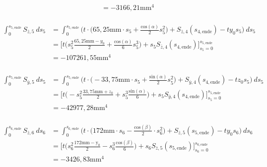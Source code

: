 \begin{itemize}
\begin{equation}
\begin{split}
			 &=-3166,21\mathrm{mm}^4
		\end{split}
	\end{equation}\\
	\begin{equation}
		\begin{split}
			\int_{0}^{s_{5,\mathrm{ende}}} S_{\bar z,5}\ ds_5 &= \int_{0}^{s_{5,\mathrm{ende}}} \bigg(t\cdot\bigg(65,25\mathrm{mm}\cdot s_5 +\frac{\mathrm{cos}(\alpha)}{2}s^2_5\bigg) + S_{\bar z,4}(s_{4,\mathrm{ende}})-ty_0s_5\bigg)\ ds_5\\\
			&= \bigg[t\bigg(s_5^2\frac{65,25\mathrm{mm}-y_0}{2}+\frac{\mathrm{cos}(\alpha)}{6}s^3_5\bigg)+s_5S_{\bar z,4}(s_{4,\mathrm{ende}})\bigg]_{s_5=0}^{s_{5,\mathrm{ende}}}\\\
			&=-107261,55\mathrm{mm}^4
		\end{split}
	\end{equation}\\
	\begin{equation}
		\begin{split}
			\int_{0}^{s_{5,\mathrm{ende}}} S_{\bar y,5}\ ds_5 &= \int_{0}^{s_{5,\mathrm{ende}}} \bigg(t\cdot\bigg(-33,75\mathrm{mm}\cdot s_5 +\frac{\mathrm{sin}(\alpha)}{2}s^2_5\bigg) + S_{\bar y,4}(s_{4,\mathrm{ende}})-tz_0s_5\bigg)\ ds_5\\\
			&=\bigg[t\bigg(-s_5^2\frac{33,75\mathrm{mm}+z_0}{2}+s_5^3\frac{\mathrm{sin}(\alpha)}{6}\bigg)+s_5S_{\bar y,4}(s_{4,\mathrm{ende}})\bigg]_{s_5=0}^{s_{5,\mathrm{ende}}}\\\
			&=-42977,28\mathrm{mm}^4
		\end{split}
	\end{equation}\\
	\begin{equation}
		\begin{split}
			\int_{0}^{s_{6,\mathrm{ende}}} S_{\bar z,6}\ ds_6 &= \int_{0}^{s_{6,\mathrm{ende}}} \bigg(t\cdot\bigg(172\mathrm{mm}\cdot s_6-\frac{\mathrm{cos}(\beta)}{2}\cdot s^2_6\bigg) + S_{\bar z,5}(s_{5,\mathrm{ende}})-ty_0s_6\bigg)\ ds_6\\\
			&=\bigg[t\bigg(s_6^2\frac{172\mathrm{mm-y_0}}{2}-s_6^3\frac{\mathrm{cos}(\beta)}{6}\bigg)+ s_6S_{\bar z,5}(s_{5,\mathrm{ende}})\bigg]_{s_6=0}^{s_{6,\mathrm{ende}}}\\\
			&=-3426,83\mathrm{mm}^4
		\end{split}
	\end{equation}\\
	\begin{equation}
		\begin{split}

\end{split}
\end{equation}
\end{itemize}
